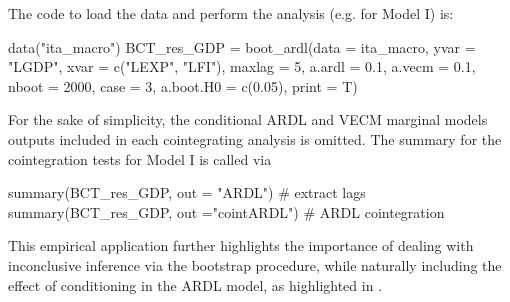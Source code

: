 The code to load the data and perform the analysis (e.g. for Model I) is:
\begin{example}
    data("ita_macro")
    BCT_res_GDP = boot_ardl(data = ita_macro,
                         yvar = "LGDP",
                         xvar = c("LEXP", "LFI"),
                         maxlag = 5,
                         a.ardl = 0.1,
                         a.vecm = 0.1,
                         nboot = 2000,
                         case = 3,
                         a.boot.H0 = c(0.05),
                         print = T)
\end{example}
For the sake of simplicity, the conditional ARDL and VECM marginal models outputs included in each cointegrating analysis is omitted. The summary for the cointegration tests for Model I is called via
\begin{example}
    summary(BCT_res_GDP, out = "ARDL") # extract lags
    summary(BCT_res_GDP, out ="cointARDL") # ARDL cointegration
\end{example}
This empirical application further highlights the importance of dealing with inconclusive inference via the bootstrap procedure, while naturally including the effect of conditioning in the ARDL model, as highlighted in \citet{bertelli2022bootstrap}.
